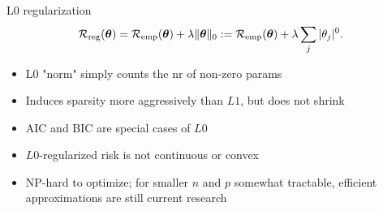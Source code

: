 \documentclass[11pt,compress,t,notes=noshow, xcolor=table]{beamer}
\begin{document}
\begin{vbframe}{L0 regularization}
\vspace{-0.3cm}
$$
\mathcal{R}_{\text{reg}}(\bm{\theta}) = \mathcal{R}_{\text{emp}}(\bm{\theta}) + \lambda \|\bm{\theta}\|_0 := \mathcal{R}_{\text{emp}}(\bm{\theta}) + \lambda \sum_j |\theta_j|^0.
$$
\vspace{-0.3cm}
\begin{figure}
\centering
{}
\end{figure}
 

\begin{itemize}
\item L0 "norm" simply counts the nr of non-zero params
\item Induces sparsity more aggressively than $L1$, but does not shrink
\item AIC and BIC are special cases of $L0$ 
\item $L0$-regularized risk is not continuous or convex
\item NP-hard to optimize; for smaller $n$ and $p$ somewhat tractable, efficient approximations are still current research
\end{itemize}
\end{vbframe}
\end{document}
